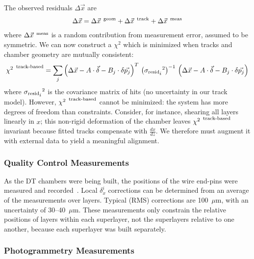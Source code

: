 The observed residuals $\Delta \vec{x}$ are
\begin{equation}
\Delta \vec{x} = \Delta \vec{x}^{\mbox{\scriptsize \, geom}} + \Delta
\vec{x}^{\mbox{\scriptsize \, track}}
+ \Delta \vec{x}^{\mbox{\scriptsize \, meas}}
\end{equation}
where $\Delta \vec{x}^{\mbox{\scriptsize \, meas}}$ is a random
contribution from measurement error, assumed to be symmetric.  We can
now construct a $\chi^2$ which is minimized when tracks and chamber
geometry are mutually consistent:
\begin{equation}
{\chi^2}^{\mbox{\scriptsize \, track-based}} = \sum_j \left(\Delta \vec{x} - A \cdot \vec{\delta} - B_j \cdot \delta \vec{p_j} \right)^T \, \left({\sigma_{\mbox{\scriptsize resid}_{\mbox{\scriptsize $i$}}}}^2\right)^{-1} \, \left(\Delta \vec{x} - A \cdot \vec{\delta} - B_j \cdot \delta \vec{p_j} \right)
\label{eqn:chi2millepede}
\end{equation}
where ${\sigma_{\mbox{\scriptsize resid}_{\mbox{\scriptsize $i$}}}}^2$
is the covariance matrix of hits (no uncertainty in our track model).
However, ${\chi^2}^{\mbox{\scriptsize \, track-based}}$ cannot be
minimized: the system has more degrees of freedom than
constraints.  Consider, for instance, shearing all layers linearly in
$x$; this non-rigid deformation of the chamber leaves
${\chi^2}^{\mbox{\scriptsize \, track-based}}$ invariant because
fitted tracks compensate with $\frac{dx}{dz}$.  We therefore must
augment it with external data to yield a meaningful alignment.

\subsubsection{Quality Control Measurements}

As the DT chambers were being built, the positions of the wire
end-pins were measured and recorded~\cite{ref:QC}.  Local $\delta_x^i$
corrections can be determined from an average of the measurements over
layers.  Typical (RMS) corrections are 100~$\mu$m, with an uncertainty of 30--40~$\mu$m.  These measurements only constrain the
relative positions of layers within each superlayer, not the
superlayers relative to one another, because each superlayer was built
separately.

\subsubsection{Photogrammetry Measurements}

